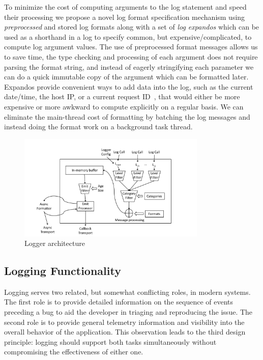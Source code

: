 To minimize the cost of computing arguments to the log statement and speed their 
processing we propose a novel log format specification mechanism using 
\emph{preprocessed} and stored log formats along with a set of \emph{log expandos} 
which can be used as a shorthand in a log to specify common, but expensive/complicated, 
to compute log argument values. The use of preprocessed format messages allows us to save time, 
the type checking and processing of each argument does not require parsing the 
format string, and instead of eagerly stringifying each parameter we can do a quick 
immutable copy of the argument which can be formatted later. Expandos provide convenient 
ways to add data into the log, such as the current date/time, the host IP, or a 
current request ID~\cite{asynchjs}, that would either be more expensive or more awkward to compute 
explicitly on a regular basis. We can eliminate the main-thread cost of formatting by batching 
the log messages and instead doing the format work on a background task thread.

\begin{figure}
    \centering
    \includegraphics[width=0.8\textwidth]{Figures/ArchDiagram}
    \caption{Logger architecture}
    \label{fig:arch}
\end{figure}

\subsection{Logging Functionality}
\label{subsec:functionalitydesign}
\begin{design}
Logging serves two related, but somewhat conflicting roles, in modern systems. 
The first role is to provide detailed information 
on the sequence of events preceding a bug to aid the developer in triaging and 
reproducing the issue. The second role is to provide general telemetry 
information and visibility into the overall behavior of the application. 
This observation leads to the third design principle: logging should 
support both tasks simultaneously without compromising the 
effectiveness of either one.
\end{design}

